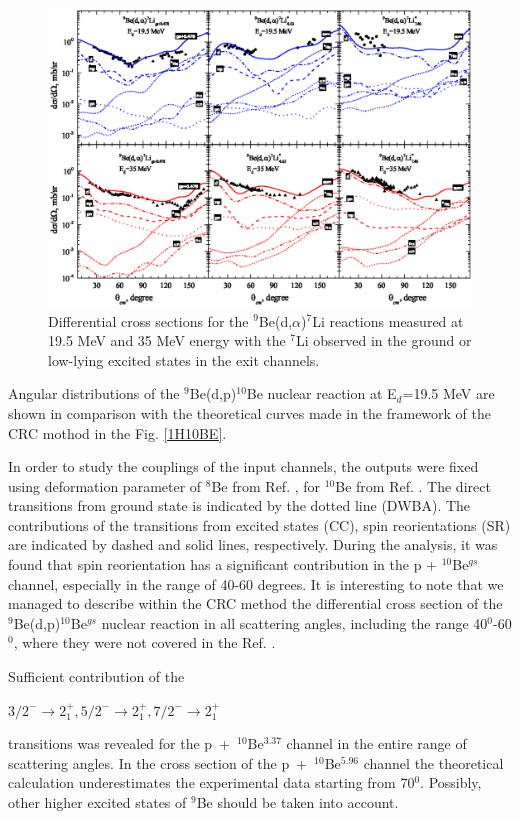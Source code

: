 \documentclass[10pt]{iopart}
\begin{document}
\begin{figure}[bp]
\centering
\includegraphics[scale=0.9]{4HE7LI.eps}
\caption{\label{label} Differential cross sections for the ${}^9$Be(d,$\alpha$)${}^7$Li reactions measured at 19.5 MeV and 35 MeV energy with the ${}^{7}$Li observed in the ground or low-lying excited states in the exit channels.}
\label{4HE7LI}
\end{figure}	

Angular distributions of the ${}^9$Be(d,p)${}^{10}$Be nuclear reaction at E$_d$=19.5 MeV are shown in comparison with the theoretical curves  made in the framework of the CRC mothod in the Fig. \ref{1H10BE}.

In order to study the couplings of the input  channels, the outputs  were fixed using deformation parameter of $^8$Be from Ref. \cite{rocca2018}, for $^{10}$Be from Ref. \cite{harakeh1980}. 
The direct transitions from ground state is indicated by the dotted line (DWBA). 
The contributions of the transitions from excited states (CC), spin reorientations (SR) are indicated by dashed and solid lines, respectively.
During the analysis, it was found that spin reorientation has a significant contribution in the p + $^{10}$Be$^{gs}$ channel, especially in the range of 40-60 degrees. 
It is interesting to note that we managed to describe within the CRC method the differential cross section of the ${}^9$Be(d,p)${}^{10}$Be$^{gs}$ nuclear reaction in all scattering angles, including the range 40$^0$-60$^0$, where they were not covered in the Ref. \cite{galanina2012, bodek1989}.
 
Sufficient contribution of the \begin{small}
$3/2^- \rightarrow 2^+_1, 5/2^- \rightarrow 2^+_1, 7/2^-\rightarrow 2^+_1$
\end{small} transitions was revealed for the p~+~$^{10}$Be$^{3.37}$ channel in the entire range of scattering angles. 
In the cross section of the  p~+~$^{10}$Be$^{5.96}$ channel the theoretical calculation underestimates the experimental data starting from 70$^0$. Possibly, other higher excited states of $^9$Be should be taken into account.
\end{document}
